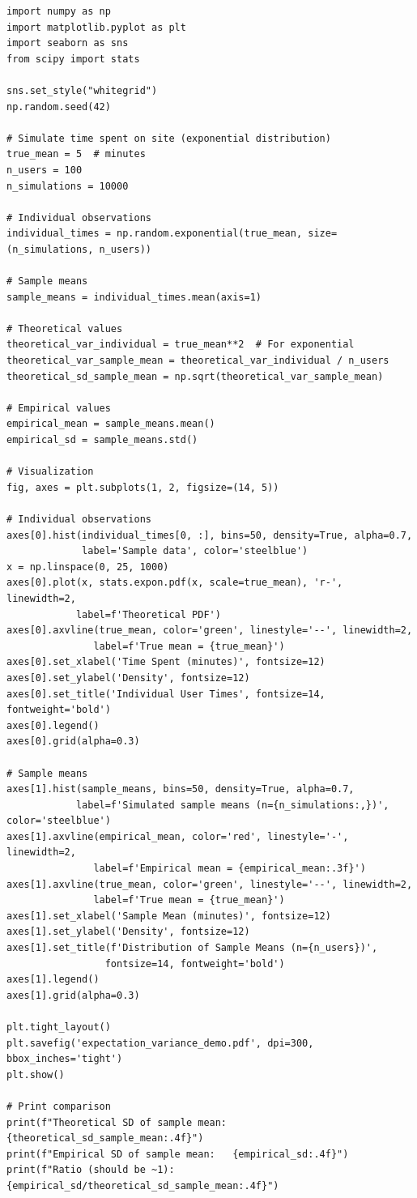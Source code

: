 \lstset{language=Python, caption=Simulating Expected Value and Variance, label=lst:expectation_sim}
\begin{lstlisting}
import numpy as np
import matplotlib.pyplot as plt
import seaborn as sns
from scipy import stats

sns.set_style("whitegrid")
np.random.seed(42)

# Simulate time spent on site (exponential distribution)
true_mean = 5  # minutes
n_users = 100
n_simulations = 10000

# Individual observations
individual_times = np.random.exponential(true_mean, size=(n_simulations, n_users))

# Sample means
sample_means = individual_times.mean(axis=1)

# Theoretical values
theoretical_var_individual = true_mean**2  # For exponential
theoretical_var_sample_mean = theoretical_var_individual / n_users
theoretical_sd_sample_mean = np.sqrt(theoretical_var_sample_mean)

# Empirical values
empirical_mean = sample_means.mean()
empirical_sd = sample_means.std()

# Visualization
fig, axes = plt.subplots(1, 2, figsize=(14, 5))

# Individual observations
axes[0].hist(individual_times[0, :], bins=50, density=True, alpha=0.7,
             label='Sample data', color='steelblue')
x = np.linspace(0, 25, 1000)
axes[0].plot(x, stats.expon.pdf(x, scale=true_mean), 'r-', linewidth=2,
            label=f'Theoretical PDF')
axes[0].axvline(true_mean, color='green', linestyle='--', linewidth=2,
               label=f'True mean = {true_mean}')
axes[0].set_xlabel('Time Spent (minutes)', fontsize=12)
axes[0].set_ylabel('Density', fontsize=12)
axes[0].set_title('Individual User Times', fontsize=14, fontweight='bold')
axes[0].legend()
axes[0].grid(alpha=0.3)

# Sample means
axes[1].hist(sample_means, bins=50, density=True, alpha=0.7,
            label=f'Simulated sample means (n={n_simulations:,})', color='steelblue')
axes[1].axvline(empirical_mean, color='red', linestyle='-', linewidth=2,
               label=f'Empirical mean = {empirical_mean:.3f}')
axes[1].axvline(true_mean, color='green', linestyle='--', linewidth=2,
               label=f'True mean = {true_mean}')
axes[1].set_xlabel('Sample Mean (minutes)', fontsize=12)
axes[1].set_ylabel('Density', fontsize=12)
axes[1].set_title(f'Distribution of Sample Means (n={n_users})',
                 fontsize=14, fontweight='bold')
axes[1].legend()
axes[1].grid(alpha=0.3)

plt.tight_layout()
plt.savefig('expectation_variance_demo.pdf', dpi=300, bbox_inches='tight')
plt.show()

# Print comparison
print(f"Theoretical SD of sample mean: {theoretical_sd_sample_mean:.4f}")
print(f"Empirical SD of sample mean:   {empirical_sd:.4f}")
print(f"Ratio (should be ~1):          {empirical_sd/theoretical_sd_sample_mean:.4f}")
\end{lstlisting}

